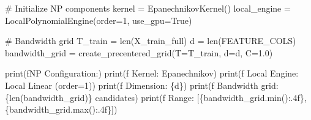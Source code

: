 \documentclass[
  letterpaper,
  DIV=11,
  numbers=noendperiod]{scrartcl}
\newenvironment{Shaded}{\begin{snugshade}}{\end{snugshade}}
\newcommand{\BuiltInTok}[1]{\textcolor[rgb]{0.00,0.23,0.31}{#1}}
\newcommand{\CommentTok}[1]{\textcolor[rgb]{0.37,0.37,0.37}{#1}}
\newcommand{\DecValTok}[1]{\textcolor[rgb]{0.68,0.00,0.00}{#1}}
\newcommand{\FloatTok}[1]{\textcolor[rgb]{0.68,0.00,0.00}{#1}}
\newcommand{\NormalTok}[1]{\textcolor[rgb]{0.00,0.23,0.31}{#1}}
\newcommand{\OperatorTok}[1]{\textcolor[rgb]{0.37,0.37,0.37}{#1}}
\newcommand{\SpecialCharTok}[1]{\textcolor[rgb]{0.37,0.37,0.37}{#1}}
\newcommand{\SpecialStringTok}[1]{\textcolor[rgb]{0.13,0.47,0.30}{#1}}
\newcommand{\VariableTok}[1]{\textcolor[rgb]{0.07,0.07,0.07}{#1}}
\begin{document}
\begin{Shaded}
\begin{Highlighting}[]
\CommentTok{\# Initialize NP components}
\NormalTok{kernel }\OperatorTok{=}\NormalTok{ EpanechnikovKernel()}
\NormalTok{local\_engine }\OperatorTok{=}\NormalTok{ LocalPolynomialEngine(order}\OperatorTok{=}\DecValTok{1}\NormalTok{, use\_gpu}\OperatorTok{=}\VariableTok{True}\NormalTok{)}

\CommentTok{\# Bandwidth grid}
\NormalTok{T\_train }\OperatorTok{=} \BuiltInTok{len}\NormalTok{(X\_train\_full)}
\NormalTok{d }\OperatorTok{=} \BuiltInTok{len}\NormalTok{(FEATURE\_COLS)}
\NormalTok{bandwidth\_grid }\OperatorTok{=}\NormalTok{ create\_precentered\_grid(T}\OperatorTok{=}\NormalTok{T\_train, d}\OperatorTok{=}\NormalTok{d, C}\OperatorTok{=}\FloatTok{1.0}\NormalTok{)}

\BuiltInTok{print}\NormalTok{(}\SpecialStringTok{f\textquotesingle{}NP Configuration:\textquotesingle{}}\NormalTok{)}
\BuiltInTok{print}\NormalTok{(}\SpecialStringTok{f\textquotesingle{}  Kernel: Epanechnikov\textquotesingle{}}\NormalTok{)}
\BuiltInTok{print}\NormalTok{(}\SpecialStringTok{f\textquotesingle{}  Local Engine: Local Linear (order=1)\textquotesingle{}}\NormalTok{)}
\BuiltInTok{print}\NormalTok{(}\SpecialStringTok{f\textquotesingle{}  Dimension: }\SpecialCharTok{\{}\NormalTok{d}\SpecialCharTok{\}}\SpecialStringTok{\textquotesingle{}}\NormalTok{)}
\BuiltInTok{print}\NormalTok{(}\SpecialStringTok{f\textquotesingle{}  Bandwidth grid: }\SpecialCharTok{\{}\BuiltInTok{len}\NormalTok{(bandwidth\_grid)}\SpecialCharTok{\}}\SpecialStringTok{ candidates\textquotesingle{}}\NormalTok{)}
\BuiltInTok{print}\NormalTok{(}\SpecialStringTok{f\textquotesingle{}  Range: [}\SpecialCharTok{\{}\NormalTok{bandwidth\_grid}\SpecialCharTok{.}\BuiltInTok{min}\NormalTok{()}\SpecialCharTok{:.4f\}}\SpecialStringTok{, }\SpecialCharTok{\{}\NormalTok{bandwidth\_grid}\SpecialCharTok{.}\BuiltInTok{max}\NormalTok{()}\SpecialCharTok{:.4f\}}\SpecialStringTok{]\textquotesingle{}}\NormalTok{)}



\end{Highlighting}
\end{Shaded}
\end{document}
